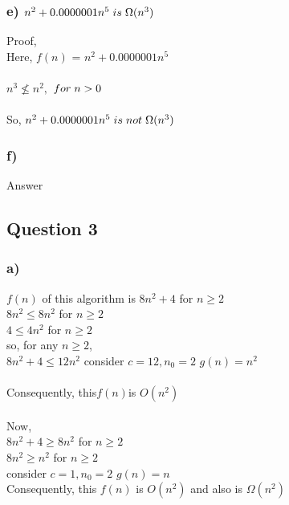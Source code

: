 \documentclass[10pt, a4paper]{article}
\begin{document}
	\subsubsection*{e) $n^2+0.0000001n^5\hspace{0.1cm} is\hspace{0.1cm} \Omega(n^3)$}
	{Proof,\\}
	Here, {$f(n)$} = {$n^2+0.0000001n^5$} \\\\
	{$ n^3 \nleq n^2  , $ \hspace{.5cm}$ for\hspace{0.1cm}n>0$\\}
	\\
	{So,\hspace{0.1cm} $n^2+0.0000001n^5\hspace{0.1cm} is\hspace{0.1cm} not \hspace{0.1cm} \Omega(n^3)$}
	
	\subsubsection*{f)}
	Answer
	
	\newpage
	
	
	
	\subsection*{Question 3}
	
	\subsubsection*{a)}
	{$f(n)$ of this algorithm is $8n^2+4$ for $n \geq 2$ \\}
	{$ 8n^2 \leq 8n^2$ for $ n \geq 2 $ \\}
	{$ 4 \leq 4n^2$ for $ n \geq 2 $ \\}
	{so, for any $n \geq 2$,\\}
	{$8n^2+4 \leq 12n^2 $ \rightarrow consider \hspace{.1cm} $c=12, n_0=2$ \rightarrow $ g(n) = n^2$ \\ \\}
	{Consequently, this\hspace{.1cm}$f(n)$\hspace{.1cm}is\hspace{.1cm} $O(n^2)$}
	\\\\
	{Now,\\}
	{$8n^2+4 \geq 8n^2 $ for $ n \geq 2$}\\
	{$8n^2 \geq n^2 $ for $ n \geq 2$}\\
	{\rightarrow consider $ c = 1, n_0 = 2 $ \rightarrow $ g(n) = n$}\\
	{Consequently, this $ f(n) $ is $ O(n^2) $ and \hspace{.1cm} also \hspace{.1cm} is $ \Omega(n^2)$}
	
\end{document}
